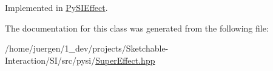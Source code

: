 Implemented in \mbox{\hyperlink{class_py_s_i_effect_ae5d044faa5644ece384d9907132076a1}{Py\+S\+I\+Effect}}.



The documentation for this class was generated from the following file\+:\begin{DoxyCompactItemize}
\item 
/home/juergen/1\+\_\+dev/projects/\+Sketchable-\/\+Interaction/\+S\+I/src/pysi/\mbox{\hyperlink{_super_effect_8hpp}{Super\+Effect.\+hpp}}\end{DoxyCompactItemize}
